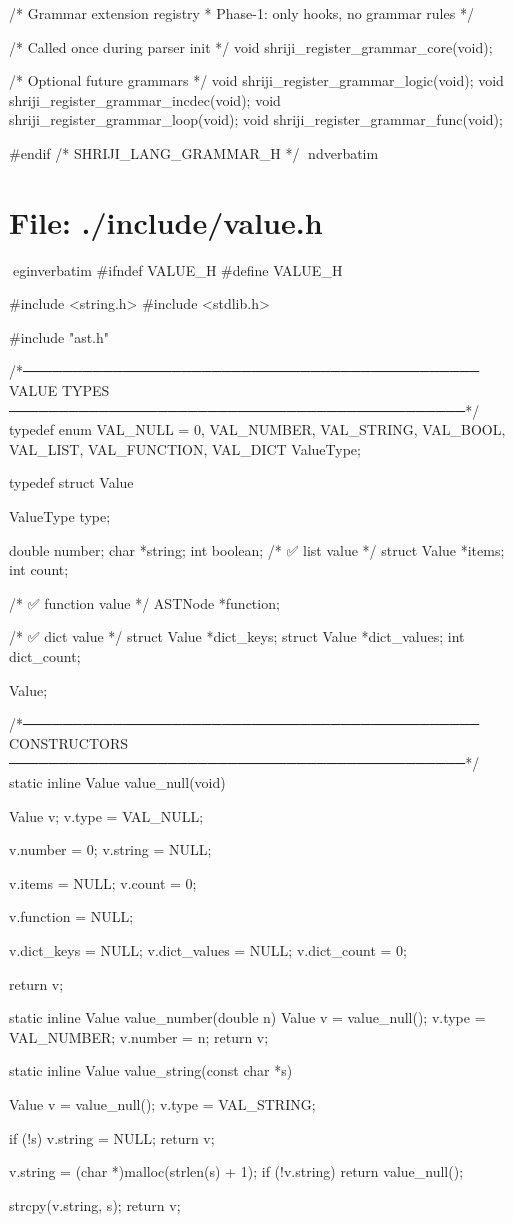 \documentclass{article}
\begin{document}
/* Grammar extension registry
 * Phase-1: only hooks, no grammar rules
 */

/* Called once during parser init */
void shriji_register_grammar_core(void);

/* Optional future grammars */
void shriji_register_grammar_logic(void);
void shriji_register_grammar_incdec(void);
void shriji_register_grammar_loop(void);
void shriji_register_grammar_func(void);

#endif /* SHRIJI_LANG_GRAMMAR_H */
nd{verbatim}
\section*{File: ./include/value.h}
egin{verbatim}
#ifndef VALUE_H
#define VALUE_H

#include <string.h>
#include <stdlib.h>

#include "ast.h"

/*──────────────────────────────────────────────
  VALUE TYPES
──────────────────────────────────────────────*/
typedef enum {
    VAL_NULL = 0,
    VAL_NUMBER,
    VAL_STRING,
    VAL_BOOL,
    VAL_LIST,
    VAL_FUNCTION,
    VAL_DICT
} ValueType;

typedef struct Value {
    ValueType type;

    double number;
    char *string;
    int boolean;
    /* ✅ list value */
    struct Value *items;
    int count;

    /* ✅ function value */
    ASTNode *function;

    /* ✅ dict value */
    struct Value *dict_keys;
    struct Value *dict_values;
    int dict_count;

} Value;

/*──────────────────────────────────────────────
  CONSTRUCTORS
──────────────────────────────────────────────*/
static inline Value value_null(void)
{
    Value v;
    v.type = VAL_NULL;

    v.number = 0;
    v.string = NULL;

    v.items = NULL;
    v.count = 0;

    v.function = NULL;

    v.dict_keys = NULL;
    v.dict_values = NULL;
    v.dict_count = 0;

    return v;
}

static inline Value value_number(double n)
{
    Value v = value_null();
    v.type = VAL_NUMBER;
    v.number = n;
    return v;
}

static inline Value value_string(const char *s)
{
    Value v = value_null();
    v.type = VAL_STRING;

    if (!s) {
        v.string = NULL;
        return v;
    }

    v.string = (char *)malloc(strlen(s) + 1);
    if (!v.string) return value_null();

    strcpy(v.string, s);
    return v;
}
\end{document}
